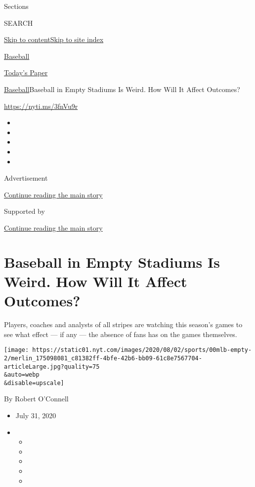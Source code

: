Sections

SEARCH

\protect\hyperlink{site-content}{Skip to
content}\protect\hyperlink{site-index}{Skip to site index}

\href{https://www.nytimes.com/section/sports/baseball}{Baseball}

\href{https://myaccount.nytimes.com/auth/login?response_type=cookie\&client_id=vi}{}

\href{https://www.nytimes.com/section/todayspaper}{Today's Paper}

\href{/section/sports/baseball}{Baseball}\textbar{}Baseball in Empty
Stadiums Is Weird. How Will It Affect Outcomes?

\url{https://nyti.ms/3fnVu9r}

\begin{itemize}
\item
\item
\item
\item
\item
\end{itemize}

Advertisement

\protect\hyperlink{after-top}{Continue reading the main story}

Supported by

\protect\hyperlink{after-sponsor}{Continue reading the main story}

\hypertarget{baseball-in-empty-stadiums-is-weird-how-will-it-affect-outcomes}{%
\section{Baseball in Empty Stadiums Is Weird. How Will It Affect
Outcomes?}\label{baseball-in-empty-stadiums-is-weird-how-will-it-affect-outcomes}}

Players, coaches and analysts of all stripes are watching this season's
games to see what effect --- if any --- the absence of fans has on the
games themselves.

\texttt{[image: https://static01.nyt.com/images/2020/08/02/sports/00mlb-empty-2/merlin\_175098081\_c81382ff-4bfe-42b6-bb09-61c8e7567704-articleLarge.jpg?quality=75\\\&auto=webp\\\&disable=upscale]}

By Robert O'Connell

\begin{itemize}
\item
  July 31, 2020
\item
  \begin{itemize}
  \item
  \item
  \item
  \item
  \item
  \end{itemize}
\end{itemize}

